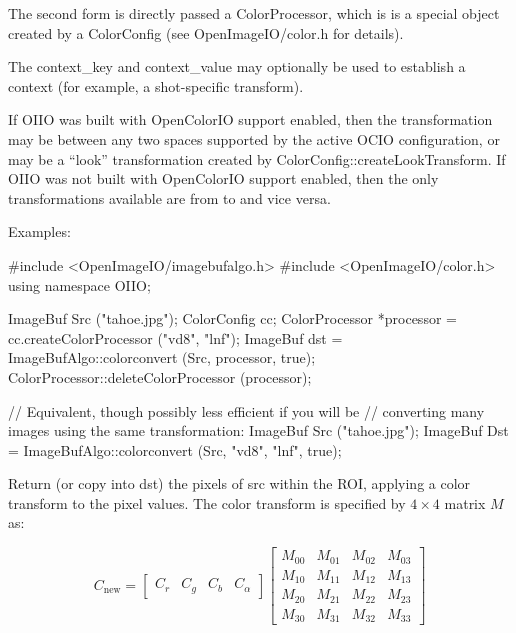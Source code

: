 The second form is directly passed a {\cf ColorProcessor}, which is is a
special object created by a {\cf ColorConfig} (see {\cf OpenImageIO/color.h}
for details).

The {\cf context_key} and {\cf context_value} may optionally be used
to establish a context (for example, a shot-specific transform).

If OIIO was built with OpenColorIO support enabled, then the transformation
may be between any two spaces supported by the active OCIO configuration, or
may be a ``look'' transformation created by {\cf
ColorConfig::createLookTransform}.  If OIIO was not built with OpenColorIO
support enabled, then the only transformations available are from 
to  and vice versa.

\smallskip
\noindent Examples:
\begin{code}
    #include <OpenImageIO/imagebufalgo.h>
    #include <OpenImageIO/color.h>
    using namespace OIIO;

    ImageBuf Src ("tahoe.jpg");
    ColorConfig cc;
    ColorProcessor *processor = cc.createColorProcessor ("vd8", "lnf");
    ImageBuf dst = ImageBufAlgo::colorconvert (Src, processor, true);
    ColorProcessor::deleteColorProcessor (processor);

    // Equivalent, though possibly less efficient if you will be
    // converting many images using the same transformation:
    ImageBuf Src ("tahoe.jpg");
    ImageBuf Dst = ImageBufAlgo::colorconvert (Src, "vd8", "lnf", true);
\end{code}
\apiend


 
\NEW %
Return (or copy into {\cf dst}) the pixels of {\cf src} within the ROI,
applying a color transform to the pixel values. The color transform is
specified by $4 \times 4$ matrix $M$ as:

$$ C_{\mathrm{new}} = \left[ \begin{array}{cccc} C_r & C_g & C_b & C_\alpha \end{array} \right]
\left[ \begin{array}{cccc}
    M_{00} & M_{01} & M_{02} & M_{03} \\
    M_{10} & M_{11} & M_{12} & M_{13} \\
    M_{20} & M_{21} & M_{22} & M_{23} \\
    M_{30} & M_{31} & M_{32} & M_{33}
\end{array} \right]
$$

